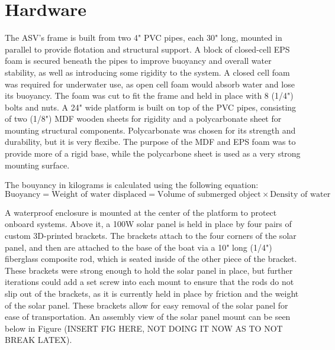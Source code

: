 \section{Hardware}

The ASV's frame is built from two 4" PVC pipes, each 30" long, mounted in parallel to provide flotation and structural support. A block of closed-cell EPS foam is secured beneath the pipes to improve buoyancy and overall water stability, as well as introducing some rigidity to the system. A closed cell foam was required for underwater use, as open cell foam would absorb water and lose its buoyancy. The foam was cut to fit the frame and held in place with 8 (1/4") bolts and nuts. A 24" wide platform is built on top of the PVC pipes, consisting of two (1/8") MDF wooden sheets for rigidity and a polycarbonate sheet for mounting structural components. Polycarbonate was chosen for its strength and durability, but it is very flexibe. The purpose of the MDF and EPS foam was to provide more of a rigid base, while the polycarbone sheet is used as a very strong mounting surface. 

The bouyancy in kilograms is calculated using the following equation:
\begin{equation}
    \text{Buoyancy} = \text{Weight of water displaced} = \text{Volume of submerged object} \times \text{Density of water}
\end{equation}

A waterproof enclosure is mounted at the center of the platform to protect onboard systems. Above it, a 100W solar panel is held in place by four pairs of custom 3D-printed brackets. The brackets attach to the four corners of the solar panel, and then are attached to the base of the boat via a 10" long (1/4") fiberglass composite rod, which is seated inside of the other piece of the bracket. These brackets were strong enough to hold the solar panel in place, but further iterations could add a set screw into each mount to ensure that the rods do not slip out of the brackets, as it is currently held in place by friction and the weight of the solar panel. These brackets allow for easy removal of the solar panel for ease of transportation. An assembly view of the solar panel mount can be seen below in Figure (INSERT FIG HERE, NOT DOING IT NOW AS TO NOT BREAK LATEX).

